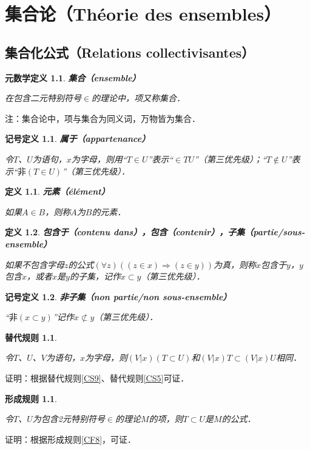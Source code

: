 \documentclass[12pt, a4paper, oneside]{book}
\newtheorem{metadef}{元数学定义}
\newtheorem{sign}{记号定义}
\newtheorem{CS}{替代规则}
\newtheorem{CF}{形成规则}
\newtheorem{de}{定义}
\begin{document}
	\chapter{集合论（Théorie des ensembles）}
		\section{集合化公式（Relations collectivisantes）}

			\begin{metadef}
				\textbf{集合（ensemble）}
				\par				
				在包含二元特别符号$\in$的理论中，项又称集合．
			\end{metadef}
			注：集合论中，项与集合为同义词，万物皆为集合．

			\begin{sign}
				\textbf{属于（appartenance）}
				\par
				令$T$、$U$为语句，$x$为字母，则用“$T\in U$”表示“$\in TU$”（第三优先级）；“$T\notin U$”表示“$\text{非}(T\in U)$”（第三优先级）．
			\end{sign}

			\begin{de}
				\textbf{元素（élément）}
				\par
				如果$A\in B$，则称$A$为$B$的元素．
			\end{de}

			\begin{de}
				\textbf{包含于（contenu dans），包含（contenir），子集（partie/sous-ensemble）}
				\par
				如果不包含字母$z$的公式$(\forall z)((z\in x)\Rightarrow(z\in y))$为真，则称$x$包含于$y$，$y$包含$x$，或者$x$是$y$的子集，记作$x\subset y$（第三优先级）．
			\end{de}

			\begin{sign}
				\textbf{非子集（non partie/non sous-ensemble）}
				\par
				“$\text{非}(x\subset y)$”记作$x\not\subset y$（第三优先级）．
			\end{sign}

			\begin{CS}\label{CS12}
				\hfill\par
				令$T$、$U$、$V$为语句，$x$为字母，则$(V|x)(T\subset U)$和$(V|x)T\subset(V|x)U$相同．
			\end{CS}
			证明：根据替代规则\ref{CS9}、替代规则\ref{CS5}可证．

			\begin{CF}\label{CF13}
				\hfill\par
				令$T$、$U$为包含2元特别符号$\in$的理论$M$的项，则$T\subset U$是$M$的公式．
			\end{CF}
			证明：根据形成规则\ref{CF8}，可证．
\end{document}
